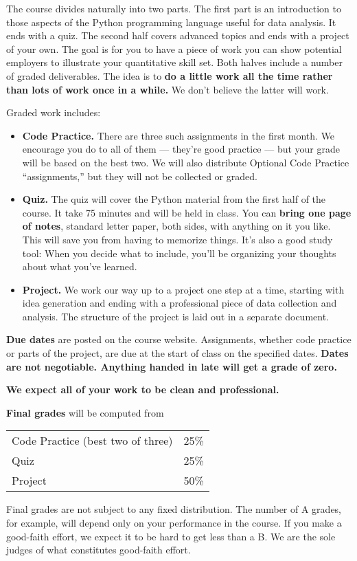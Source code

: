 \documentclass[11pt]{article}
\begin{document}
The course divides naturally into two parts.
The first part is an introduction to those aspects of the Python programming language
useful for data analysis.
It ends with a quiz.
The second half covers advanced topics and ends with a project of your own.
The goal is for you to have a piece of work you can show potential employers to
illustrate your quantitative skill set.
Both halves include a number of graded deliverables.
The idea is to {\bf do a little work all the time rather than lots of work once in a while.}
We don't believe the latter will work.

Graded work includes:
%
\begin{itemize}

\item {\bf Code Practice.\/}
There are three such assignments in the first month.
We encourage you do to all of them --- they're good practice ---
but your grade will be based on the best two.
We will also distribute Optional Code Practice ``assignments,''
but they will not be collected or graded.

\item {\bf Quiz.\/}
The quiz will cover the Python material from the first half of the course.
It take 75 minutes and will be held in class.
You can {\bf bring one page of notes\/}, standard letter paper,
both sides, with anything on it you like.
This will save you from having to memorize things.
It's also a good study tool:  When you decide what to include,
you'll be organizing your thoughts about what you've learned.

\item {\bf Project.\/}
We work our way up to a project one step at a time, starting with idea generation and ending
with a professional piece of data collection and analysis.
The structure of the project is laid out in a separate document.

\end{itemize}


{\bf Due dates} are posted on the course website.
Assignments, whether code practice or parts of the project,
are due at the start of class on the specified dates.
{\bf Dates are not negotiable.
Anything handed in late will get a grade of zero.\/}

{\bf We expect all of your work to be clean and professional.}


{\bf Final grades\/} will be computed from
\begin{center}
\begin{tabular}{ll}
Code Practice (best two of three) & 25\% \\
Quiz        & 25\% \\
Project     & 50\% \\
\end{tabular}
\end{center}
Final grades are not subject to any fixed distribution.
The number of A grades, for example,
will depend only on your performance in the course.
If you make a good-faith effort,
we expect it to be hard to get less than a B.
We are the sole judges of what constitutes good-faith effort.
\end{document}
